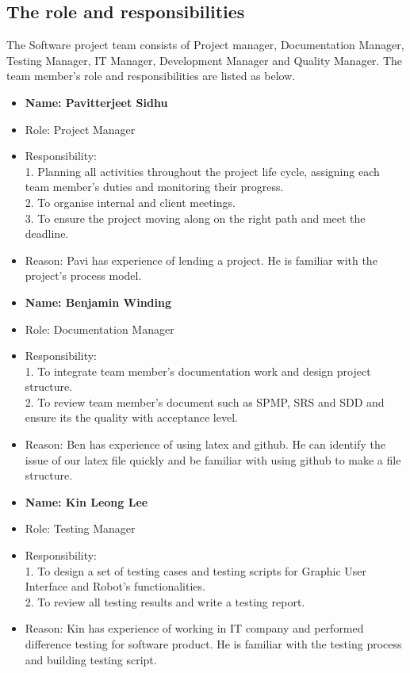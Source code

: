 \subsection{The role and responsibilities}
The Software project team consists of Project manager, Documentation Manager, Testing Manager, IT Manager, Development Manager and Quality Manager. The team member’s role and responsibilities are listed as below.

\begin{itemize}
\item \textbf{Name: Pavitterjeet Sidhu}
\item Role: Project Manager
\item Responsibility: \\
1.	Planning all activities throughout the project life cycle, assigning each team member’s duties and monitoring their progress.\\
2.	To organise internal and client meetings.\\
3.	To ensure the project moving along on the right path and meet the deadline.
\item Reason:
Pavi has experience of lending a project. He is familiar with the project’s process model.
\end{itemize}

\newpage
\begin{itemize}
\item \textbf{Name: Benjamin Winding}
\item Role: Documentation Manager
\item Responsibility:\\
1.	To integrate team member’s documentation work and design project structure.\\
2.	To review team member’s document such as SPMP, SRS and SDD and ensure its the quality with acceptance level.
\item Reason:
Ben has experience of using latex and github. He can identify the issue of our latex file quickly and be familiar with using github to make a file structure.
\end{itemize}

\begin{itemize}
\item \textbf{Name: Kin Leong Lee}
\item Role: Testing Manager
\item Responsibility:\\
1.	To design a set of testing cases and testing scripts for Graphic User Interface and Robot’s functionalities.\\
2.	To review all testing results and write a testing report.
\item Reason:
Kin has experience of working in IT company and performed difference testing for software product. He is familiar with the testing process and building testing script.
\end{itemize}


